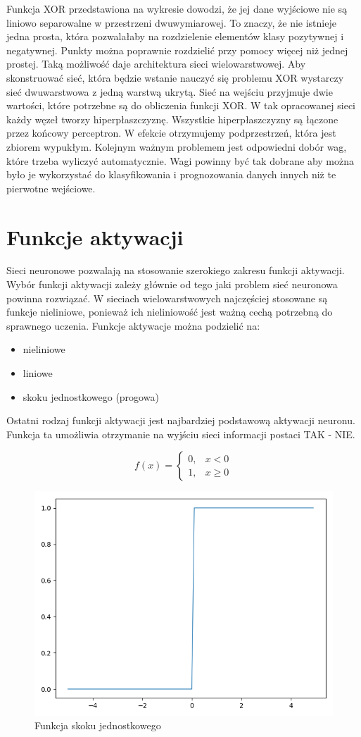 Funkcja XOR przedstawiona na wykresie dowodzi, że jej dane wyjściowe nie są liniowo separowalne w przestrzeni dwuwymiarowej. To znaczy, że nie istnieje jedna prosta, która pozwalałaby na rozdzielenie elementów klasy pozytywnej i negatywnej. Punkty można poprawnie rozdzielić przy pomocy więcej niż jednej prostej. Taką możliwość daje architektura sieci wielowarstwowej. Aby skonstruować sieć, która będzie wstanie nauczyć się problemu XOR wystarczy sieć dwuwarstwowa z jedną warstwą ukrytą. Sieć na wejściu przyjmuje dwie wartości, które potrzebne są do obliczenia funkcji XOR. W tak opracowanej sieci każdy węzeł tworzy hiperpłaszczyznę. Wszystkie hiperpłaszczyzny są łączone przez końcowy perceptron. W efekcie otrzymujemy podprzestrzeń, która jest zbiorem wypukłym. Kolejnym ważnym problemem jest odpowiedni dobór wag, które trzeba wyliczyć automatycznie. Wagi powinny być tak dobrane aby można było je wykorzystać do klasyfikowania i prognozowania danych innych niż te pierwotne wejściowe. 

\section{Funkcje aktywacji}

Sieci neuronowe pozwalają na stosowanie szerokiego zakresu funkcji aktywacji. Wybór funkcji aktywacji zależy głównie od tego jaki problem sieć neuronowa powinna rozwiązać. W sieciach wielowarstwowych najczęściej stosowane są funkcje nieliniowe, ponieważ ich nieliniowość jest ważną cechą potrzebną do sprawnego uczenia. Funkcje aktywacje można podzielić na:

\begin{itemize}
	\item nieliniowe
	\item liniowe
	\item skoku jednostkowego (progowa)
\end{itemize}

Ostatni rodzaj funkcji aktywacji jest najbardziej podstawową aktywacji neuronu. Funkcja ta umożliwia otrzymanie na wyjściu sieci informacji postaci TAK - NIE. 

\begin{equation}
f(x)= 
\begin{cases}
0,&  x < 0\\
1,   & x \ge 0
\end{cases}
\end{equation}

\begin{figure}[H]
	\centering
	\includegraphics[width=0.5\linewidth]{stepfunction}
	\caption{Funkcja skoku jednostkowego}
	\label{fig:stepfunction}
\end{figure}

